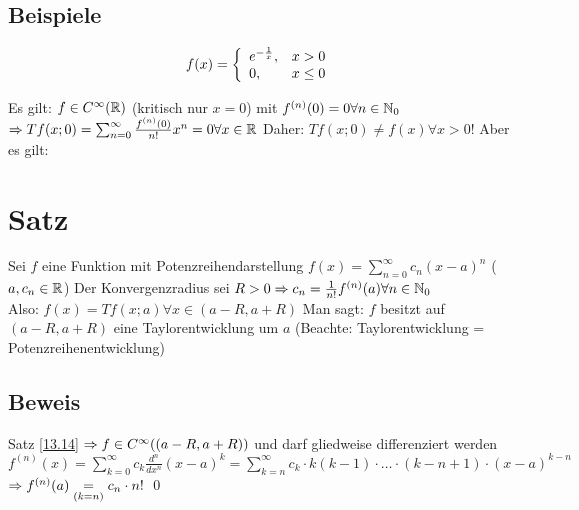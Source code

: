 \subsection*{Beispiele}
$$f(x) = \left\{\begin{array}{l l} e^{-\frac{1}{x}}, & x > 0 \\ 0, & x \le 0 \end{array}\right.$$
\nl
Es gilt: $f \in C^\infty(\mathbb{R})$ (kritisch nur $x=0$) mit $f^{(n)}(0)=0 \forall n \in \mathbb{N}_0$\\
$\Rightarrow Tf(x;0) = \sum_{n=0}^\infty \frac{f^{(n)}(0)}{n!} x^n = 0 \forall x \in \mathbb{R}$\nl
Daher: $Tf(x;0) \neq f(x) \forall x>0$!\nl
Aber es gilt:

\section{Satz}\label{15.7}
Sei $f$ eine Funktion mit Potenzreihendarstellung $f(x)=\sum_{n=0}^\infty c_n(x-a)^n$ ($a, c_n \in \mathbb{R}$)\nl
Der Konvergenzradius sei $R > 0 \Rightarrow c_n = \frac{1}{n!} f^{(n)}(a) \forall n \in \mathbb{N}_0$\\
Also: $f(x) = Tf(x;a) \forall x \in (a-R,a+R)$\nl
Man sagt: $f$ besitzt auf $(a-R,a+R)$ eine Taylorentwicklung um $a$ (Beachte: Taylorentwicklung = Potenzreihenentwicklung)

\subsection*{Beweis}
Satz \ref{13.14} $\Rightarrow f \in C^\infty((a-R,a+R))$ und darf gliedweise differenziert werden\nl
$f^{(n)}(x) = \sum_{k=0}^\infty c_k \frac{d^n}{dx^n}(x-a)^k = \sum_{k=n}^\infty c_k \cdot k(k-1) \cdot \ldots \cdot (k-n+1) \cdot (x-a)^{k-n}$\\
$\Rightarrow f^{(n)}(a) \underset{(k=n)}{=} c_n \cdot n!$ \qed
